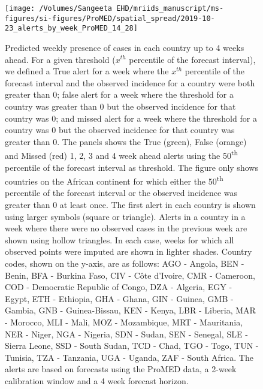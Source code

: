 \documentclass[9pt,twoside,lineno]{pnas-new}
\begin{document}
\begin{figure}
\centering
\texttt{[image: /Volumes/Sangeeta EHD/mriids\_manuscript/ms-figures/si-figures/ProMED/spatial\_spread/2019-10-23\_alerts\_by\_week\_ProMED\_14\_28]}
\caption{Predicted weekly presence of cases in
each country up to 4 weeks ahead. For a given threshold (\(x^{th}\)
percentile of the forecast interval), we defined a True alert for a week
where the \(x^{th}\) percentile of the forecast interval and the
observed incidence for a country were both greater than 0; false alert
for a week where the threshold for a country was greater than 0 but the
observed incidence for that country was 0; and missed alert for a week where
the threshold for a country was 0 but the observed incidence for that
country was greater than 0. The panels shows the True (green), False (orange) and
Missed (red) 1, 2, 3 and 4 week ahead alerts using the 
50\textsuperscript{th} percentile of the forecast interval as threshold. 
The figure only shows countries on the
African continent for which either the 50\textsuperscript{th}
percentile of the forecast interval or the
observed incidence was greater than 0 at least once. 
The first alert in each country is shown
using larger symbols (square or triangle). Alerts in a country in a
week where there were no observed cases in the previous week are shown
using hollow triangles. In each case, weeks for which all observed points
were imputed are shown in lighter shades.
Country codes, shown on the y-axis, are as
follows: AGO - Angola, BEN - Benin, BFA - Burkina Faso, CIV - Côte
d'Ivoire, CMR - Cameroon, COD - Democratic Republic of Congo, DZA -
Algeria, EGY - Egypt, ETH - Ethiopia, 
GHA - Ghana, GIN - Guinea, GMB - Gambia, GNB - Guinea-Bissau, 
KEN - Kenya, LBR - Liberia, MAR - Morocco, 
MLI - Mali,
MOZ - Mozambique,
MRT - Mauritania,
NER - Niger,
NGA - Nigeria,
SDN - Sudan,
SEN - Senegal,
SLE - Sierra Leone,
SSD - South Sudan,
TCD - Chad,
TGO - Togo,
TUN - Tunisia,
TZA - Tanzania,
UGA - Uganda,
ZAF - South Africa. The alerts are based on forecasts 
using the ProMED data, a 2-week calibration window and a 4 week
forecast horizon.}
\label{fig:alerts4weekahead}
\end{figure}\FloatBarrier
\end{document}

